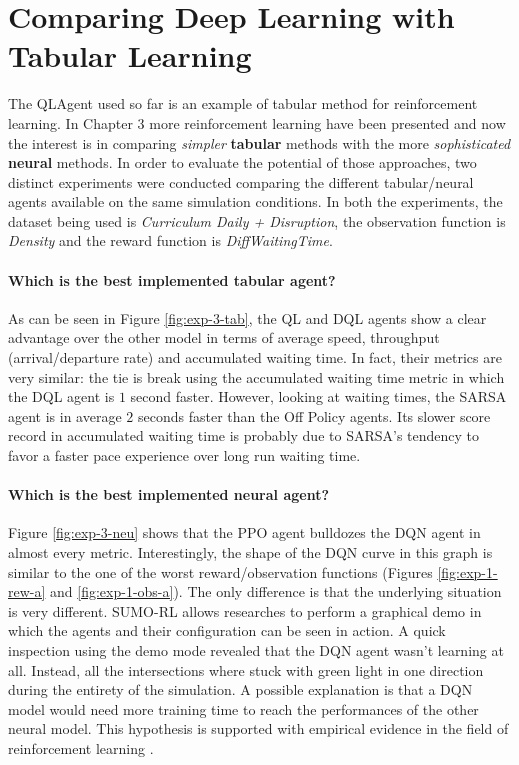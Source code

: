 \section{Comparing Deep Learning with Tabular Learning}

The QLAgent used so far is an example of tabular method for reinforcement learning.
In Chapter 3 more reinforcement learning have been presented and now the interest is in comparing \textit{simpler} \textbf{tabular} methods with the more \textit{sophisticated} \textbf{neural} methods.
In order to evaluate the potential of those approaches, two distinct experiments were conducted comparing the different tabular/neural agents available on the same simulation conditions.
In both the experiments, the dataset being used is \textit{Curriculum Daily + Disruption}, the observation function is \textit{Density} and the reward function is \textit{DiffWaitingTime}.

\paragraph{Which is the best implemented tabular agent?}

As can be seen in Figure \ref{fig:exp-3-tab}, the QL and DQL agents show a clear advantage over the other model in terms of average speed, throughput (arrival/departure rate) and accumulated waiting time.
In fact, their metrics are very similar: the tie is break using the accumulated waiting time metric in which the DQL agent is $1$ second faster.
However, looking at waiting times, the SARSA agent is in average $2$ seconds faster than the Off Policy agents.
Its slower score record in accumulated waiting time is probably due to SARSA's tendency to favor a faster pace experience over long run waiting time.


\paragraph{Which is the best implemented neural agent?}

Figure \ref{fig:exp-3-neu} shows that the PPO agent bulldozes the DQN agent in almost every metric.
Interestingly, the shape of the DQN curve in this graph is similar to the one of the worst reward/observation functions (Figures \ref{fig:exp-1-rew-a} and \ref{fig:exp-1-obs-a}).
The only difference is that the underlying situation is very different.
SUMO-RL allows researches to perform a graphical demo in which the agents and their configuration can be seen in action.
A quick inspection using the demo mode revealed that the DQN agent wasn't learning at all.
Instead, all the intersections where stuck with green light in one direction during the entirety of the simulation.
A possible explanation is that a DQN model would need more training time to reach the performances of the other neural model.
This hypothesis is supported with empirical evidence in the field of reinforcement learning \cite{kozlica2023deep}.

